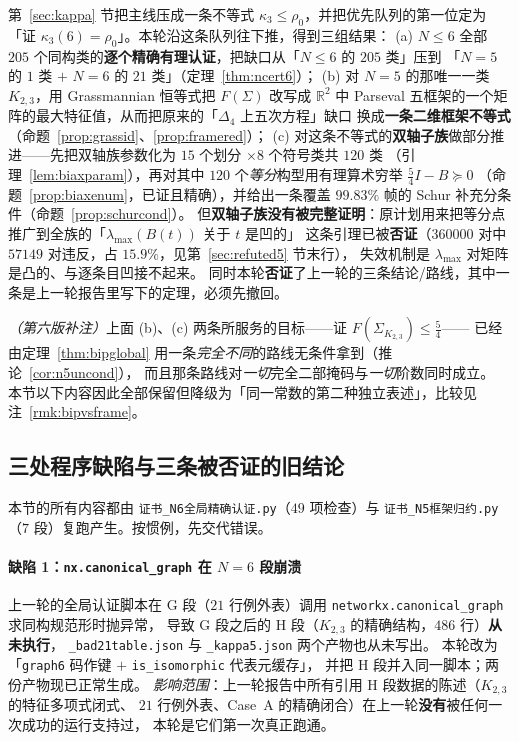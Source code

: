 \documentclass[UTF8,11pt]{ctexart}
\theoremstyle{definition}
\newcommand{\R}{\mathbb{R}}
\begin{document}
第~\ref{sec:kappa} 节把主线压成一条不等式 $\kappa_3\le\rho_0$，并把优先队列的第一位定为
「证 $\kappa_3(6)=\rho_0$」。本轮沿这条队列往下推，得到三组结果：
(a) $N\le6$ 全部 $205$ 个同构类的\textbf{逐个精确有理认证}，把缺口从「$N\le6$ 的 $205$ 类」压到
「$N=5$ 的 $1$ 类 $+$ $N=6$ 的 $21$ 类」（定理~\ref{thm:ncert6}）；
(b) 对 $N=5$ 的那唯一一类 $K_{2,3}$，用 Grassmannian 恒等式把 $F(\Sigma)$ 改写成
$\R^2$ 中 Parseval 五框架的一个矩阵的最大特征值，从而把原来的「$\Delta_4$ 上五次方程」缺口
换成\textbf{一条二维框架不等式}（命题~\ref{prop:grassid}、\ref{prop:framered}）；
(c) 对这条不等式的\textbf{双轴子族}做部分推进——先把双轴族参数化为 $15$ 个划分 $\times8$ 个符号类共 $120$ 类
（引理~\ref{lem:biaxparam}），再对其中 $120$ 个\emph{等分}构型用有理算术穷举 $\frac54I-B\succeq0$
（命题~\ref{prop:biaxenum}，已证且精确），并给出一条覆盖 $99.83\%$ 帧的 Schur 补充分条件（命题~\ref{prop:schurcond}）。
但\textbf{双轴子族没有被完整证明}：原计划用来把等分点推广到全族的「$\lambda_{\max}(B(t))$ 关于 $t$ 是凹的」
这条引理已被\textbf{否证}（$360000$ 对中 $57149$ 对违反，占 $15.9\%$，见第~\ref{sec:refuted5} 节末行），
失效机制是 $\lambda_{\max}$ 对矩阵是凸的、与逐条目凹接不起来。
同时本轮\textbf{否证}了上一轮的三条结论/路线，其中一条是上一轮报告里写下的定理，必须先撤回。

\emph{（第六版补注）}上面 (b)、(c) 两条所服务的目标——证 $F(\Sigma_{K_{2,3}})\le\frac54$——
已经由定理~\ref{thm:bipglobal} 用一条\emph{完全不同}的路线无条件拿到（推论~\ref{cor:n5uncond}），
而且那条路线对\emph{一切}完全二部掩码与\emph{一切}阶数同时成立。
本节以下内容因此全部保留但降级为「同一常数的第二种独立表述」，比较见注~\ref{rmk:bipvsframe}。

\subsection{三处程序缺陷与三条被否证的旧结论}\label{sec:bugs5}

本节的所有内容都由 \texttt{证书\_N6全局精确认证.py}（$49$ 项检查）与
\texttt{证书\_N5框架归约.py}（$7$ 段）复跑产生。按惯例，先交代错误。

\paragraph{缺陷 1：\texttt{nx.canonical\_graph} 在 $N=6$ 段崩溃}
上一轮的全局认证脚本在 G 段（$21$ 行例外表）调用 \texttt{networkx.canonical\_graph} 求同构规范形时抛异常，
导致 G 段之后的 H 段（$K_{2,3}$ 的精确结构，$486$ 行）\textbf{从未执行}，
\texttt{\_bad21table.json} 与 \texttt{\_kappa5.json} 两个产物也从未写出。
本轮改为「\texttt{graph6} 码作键 $+$ \texttt{is\_isomorphic} 代表元缓存」，
并把 H 段并入同一脚本；两份产物现已正常生成。
\emph{影响范围}：上一轮报告中所有引用 H 段数据的陈述（$K_{2,3}$ 的特征多项式闭式、
$21$ 行例外表、Case~A 的精确闭合）在上一轮\textbf{没有}被任何一次成功的运行支持过，
本轮是它们第一次真正跑通。
\end{document}
